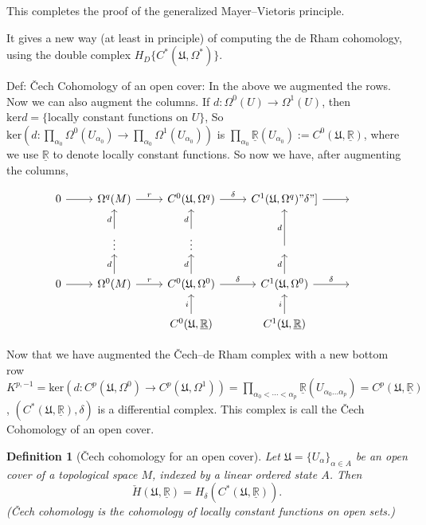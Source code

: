 \documentclass{article}
\theoremstyle{mystyle}
\newtheorem*{definition}{Definition}%
\theoremstyle{remark}
\numberwithin{equation}{section}
\begin{document}
This completes the proof of the generalized Mayer--Vietoris principle. 

It gives a new way (at least in principle) of computing the de Rham cohomology, using the double complex $H_D\{C^*(\mathfrak{U},\Omega^*)\}$.


Def: Čech Cohomology of an open cover: In the above we augmented the rows. Now we can also augment the columns. If $d\colon \Omega^0(U)\rightarrow \Omega^1(U)$, then $\mathrm{ker}d = \{\text{locally constant functions on }U\}$, So $\mathrm{ker}\left(d\colon \prod_{\alpha_0}\Omega^0(U_{\alpha_0})
\rightarrow \prod_{\alpha_0}\Omega^1(U_{\alpha_0})\right)$ is $\prod_{\alpha_0} \underline{\mathbb{R}}(U_{\alpha_0}):=C^0(\mathfrak{U},\underline{\mathbb{R}})$, where we use $\underline{\mathbb{R}}$ to denote locally constant functions. So now we have, after augmenting the columns,

$$
\begin{tikzcd}
0\ar[r] & \Omega^q(M)\ar[r,"r"] & C^0(\mathfrak{U},\Omega^q)\ar[r,"\delta"] & C^1(\mathfrak{U},\Omega^q)\ar[r]"\delta"] &~\\
&\vdots \ar[u,"d"] & \vdots \ar[u,"d"] &\ar[u,"d"]&~\\
0\ar[r] & \Omega^0(M)\ar[r,"r"] \ar[u,"d"] & C^0(\mathfrak{U},\Omega^0)\ar[u,"d"] \ar[r,"\delta"] &
C^1(\mathfrak{U},\Omega^0)\ar[u,"d"]\ar[r,"\delta"]&~\\
&& C^0(\mathfrak{U},\underline{\mathbb{R}})\ar[u,"i"]& C^1(\mathfrak{U},\underline{\mathbb{R}})\ar[u,"i"] &
\end{tikzcd}
$$

Now that we have augmented the Čech--de Rham complex with a new bottom row $K^{p,-1} = \mathrm{ker} \left(d\colon C^p(\mathfrak{U},\Omega^0)\rightarrow C^p(\mathfrak{U},\Omega^1)\right) = \prod_{\alpha_0<\cdots <\alpha_p}\underline{\mathbb{R}}(U_{\alpha_0...\alpha_p})
=C^p(\mathfrak{U},\underline{\mathbb{R}})$, $(C^*(\mathfrak{U},\underline{\mathbb{R}}),\delta)$ is a differential complex. This complex is call the Čech Cohomology of an open cover.


\begin{definition}[Čech cohomology for an open cover]
Let $\mathfrak{U} = \{U_\alpha\}_{\alpha \in A}$ be an open cover of a topological space $M$, indexed by a linear ordered state $A$. Then 
$$\check{H}(\mathfrak{U},\underline{\mathbb{R}})
=
H_\delta(C^*(\mathfrak{U},\underline{\mathbb{R}})).$$
(Čech cohomology is the cohomology of locally constant functions on open sets.)
\end{definition}
\end{document}
